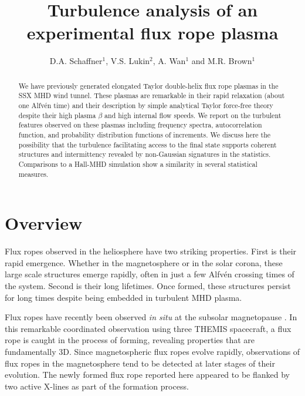 \documentclass[12pt]{iopart}
\begin{document}
\title{Turbulence analysis of an experimental flux rope plasma}

\author{D.A. Schaffner$^{1}$, V.S. Lukin$^{2}$, A. Wan$^{1}$ and M.R. Brown$^{1}$}

\address{$^{1}$ Swarthmore College, Swarthmore, PA, USA}
\address{$^{2}$ Naval Research Laboratory, Washington, DC, USA}
\begin{abstract}
We have previously generated elongated Taylor double-helix flux rope plasmas in the SSX MHD wind tunnel.  These plasmas are remarkable in their rapid relaxation (about one Alfv\'en time) and their description by simple analytical Taylor force-free theory despite their high plasma $\beta$ and high internal flow speeds. We report on the turbulent features observed on these plasmas including frequency spectra, autocorrelation function, and probability distribution functions of increments.  We discuss here the possibility that the turbulence facilitating access to the final state supports coherent structures and intermittency revealed by non-Gaussian signatures in the statistics.  Comparisons to a Hall-MHD simulation show a similarity in several statistical measures.
\end{abstract}

\submitto{\PPCF}
\maketitle

\section{Overview}
Flux ropes observed in the heliosphere have two striking properties.   First is their rapid emergence.  Whether in the magnetosphere or in the solar corona, these large scale structures emerge rapidly, often in just a few Alfv\'en crossing times of the system.  Second is their long lifetimes.  Once formed, these structures persist for long times despite being embedded in turbulent MHD plasma.  

Flux ropes have recently been observed {\it in situ} at the subsolar magnetopause \cite{Oieroset11}.  In this remarkable coordinated observation using three THEMIS spacecraft, a flux rope is caught in the process of forming, revealing properties that are fundamentally 3D. Since magnetospheric flux ropes evolve rapidly, observations of flux ropes in the magnetosphere tend to be detected at later stages of their evolution.  The newly formed flux rope reported here appeared to be flanked by two active X-lines as part of the formation process.
\end{document}
